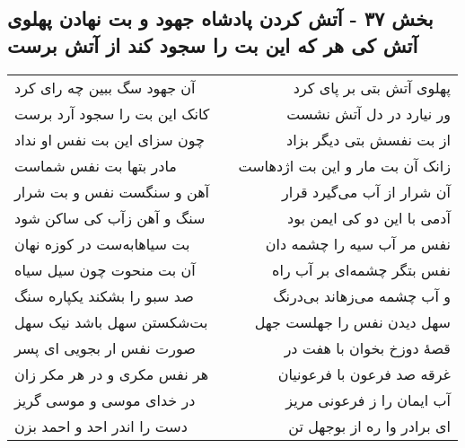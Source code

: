\begin{center}
\section*{بخش ۳۷ - آتش کردن پادشاه جهود و بت نهادن پهلوی آتش کی هر که این بت را سجود کند از آتش برست}
\label{sec:sh037}
\begin{longtable}{l p{0.5cm} r}
آن جهود سگ ببین چه رای کرد
&&
پهلوی آتش بتی بر پای کرد
\\
کانک این بت را سجود آرد برست
&&
ور نیارد در دل آتش نشست
\\
چون سزای این بت نفس او نداد
&&
از بت نفسش بتی دیگر بزاد
\\
مادر بتها بت نفس شماست
&&
زانک آن بت مار و این بت اژدهاست
\\
آهن و سنگست نفس و بت شرار
&&
آن شرار از آب می‌گیرد قرار
\\
سنگ و آهن زآب کی ساکن شود
&&
آدمی با این دو کی ایمن بود
\\
بت سیاهابه‌ست در کوزه نهان
&&
نفس مر آب سیه را چشمه دان
\\
آن بت منحوت چون سیل سیاه
&&
نفس بتگر چشمه‌ای بر آب راه
\\
صد سبو را بشکند یکپاره سنگ
&&
و آب چشمه می‌زهاند بی‌درنگ
\\
بت‌شکستن سهل باشد نیک سهل
&&
سهل دیدن نفس را جهلست جهل
\\
صورت نفس ار بجویی ای پسر
&&
قصهٔ دوزخ بخوان با هفت در
\\
هر نفس مکری و در هر مکر زان
&&
غرقه صد فرعون با فرعونیان
\\
در خدای موسی و موسی گریز
&&
آب ایمان را ز فرعونی مریز
\\
دست را اندر احد و احمد بزن
&&
ای برادر وا ره از بوجهل تن
\\
\end{longtable}
\end{center}
